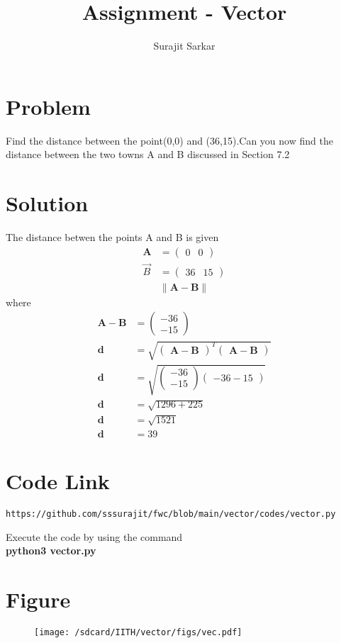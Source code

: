 \documentclass[journal,12pt,twocolumn]{IEEEtran}
\title{\mytitle}
\title{
Assignment - Vector
}
\author{Surajit Sarkar}
\newcommand{\myvec}[1]{\ensuremath{\begin{pmatrix}#1\end{pmatrix}}}
\providecommand{\norm}[1]{\lVert#1\rVert}
\let\vec\mathbf
\begin{document}
\maketitle
\tableofcontents
\bigskip
\section{\textbf{Problem}}
Find the distance between the point(0,0) and (36,15).Can you now find the distance between the two towns A and B discussed in Section 7.2
\section{\textbf{Solution}}
The distance betwen the points A and B is given
\begin{align*}
\vec{A}&=\myvec{0 & 0} \\ 
\Vec{B}&=\myvec{36 & 15} \\ 
&\norm{\vec{A}-\vec{B}}
\end{align*}
where
\begin{align*}
\vec{A}-\vec{B}&=\myvec{-36\\-15} \\
\vec{d}&=\sqrt{\myvec{\vec{A}-\vec{B}}^T\myvec{\vec{A}-\vec{B}}} \\
\vec{d}& =\sqrt{\myvec{-36\\-15}{\myvec{-36-15}}} \\
\vec{d}&=\sqrt{1296+225} \\
\vec{d}&=\sqrt{1521} \\
\vec{d}&=39
\end{align*}
\section{\textbf{Code Link}}
\begin{lstlisting}
https://github.com/sssurajit/fwc/blob/main/vector/codes/vector.py
\end{lstlisting}
Execute the code by using the command\\
\textbf{python3 vector.py}
\section{\textbf{Figure}}
\begin{figure}[!h]
\centering
\texttt{[image: /sdcard/IITH/vector/figs/vec.pdf]}
\caption{}
\label{fig:vec}
\end{figure}
\end{document}
